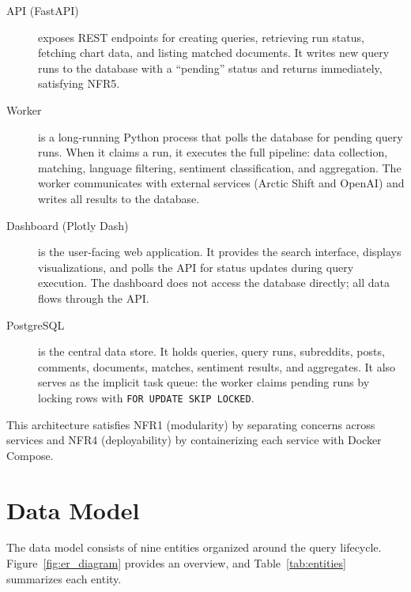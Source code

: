 \begin{description}
    \item[API (FastAPI)] exposes REST endpoints for creating queries, retrieving run status, fetching chart data, and listing matched documents. It writes new query runs to the database with a ``pending'' status and returns immediately, satisfying NFR5.

    \item[Worker] is a long-running Python process that polls the database for pending query runs. When it claims a run, it executes the full pipeline: data collection, matching, language filtering, sentiment classification, and aggregation. The worker communicates with external services (Arctic Shift and OpenAI) and writes all results to the database.

    \item[Dashboard (Plotly Dash)] is the user-facing web application. It provides the search interface, displays visualizations, and polls the API for status updates during query execution. The dashboard does not access the database directly; all data flows through the API.

    \item[PostgreSQL] is the central data store. It holds queries, query runs, subreddits, posts, comments, documents, matches, sentiment results, and aggregates. It also serves as the implicit task queue: the worker claims pending runs by locking rows with \texttt{FOR UPDATE SKIP LOCKED}.
\end{description}

This architecture satisfies NFR1 (modularity) by separating concerns across services and NFR4 (deployability) by containerizing each service with Docker Compose.

\section{Data Model}
\label{sec:data_model}

The data model consists of nine entities organized around the query lifecycle. Figure~\ref{fig:er_diagram} provides an overview, and Table~\ref{tab:entities} summarizes each entity.

